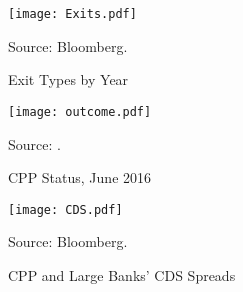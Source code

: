 \documentclass[12pt]{article}
\begin{document}
\begin{figure}[h]
\caption{Exit Types by Year}\label{exits}
\centering
\texttt{[image: Exits.pdf]}
\raggedright
\footnotesize Source: Bloomberg.
\end{figure}

\begin{figure}[h]
\caption{CPP Status, June 2016}\label{outcome}
\centering
\texttt{[image: outcome.pdf]}
\raggedright
\footnotesize Source: \citet{GAO}. 
\end{figure}


\begin{figure}[h]
\caption{CPP and Large Banks' CDS Spreads}\label{CDS}
\centering
\texttt{[image: CDS.pdf]}
\raggedright
\footnotesize Source: Bloomberg.
\end{figure}
\end{document}
